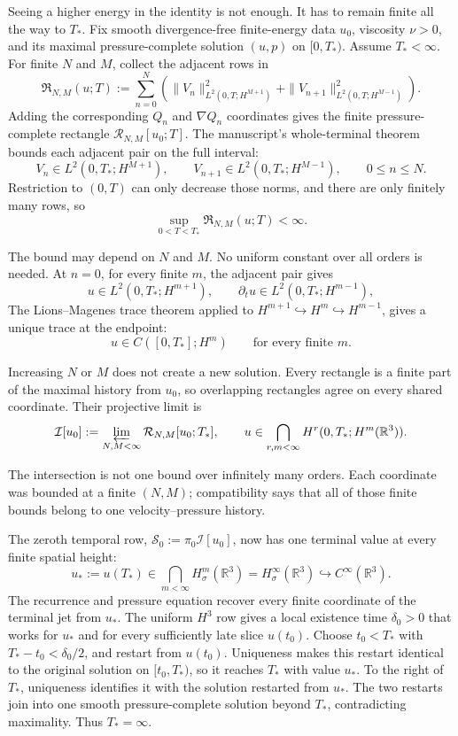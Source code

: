 Seeing a higher energy in the identity is not enough. It has to remain finite
all the way to \(T_*\). Fix smooth divergence-free finite-energy data \(u_0\),
viscosity \(\nu>0\), and its maximal pressure-complete solution \((u,p)\) on
\([0,T_*)\). Assume \(T_*<\infty\). For finite \(N\) and \(M\), collect the
adjacent rows in
\[
\mathfrak R_{N,M}(u;T)
:=\sum_{n=0}^{N}\left(
  \|V_n\|_{L^2(0,T;H^{M+1})}^2
 +\|V_{n+1}\|_{L^2(0,T;H^{M-1})}^2
\right).
\]
Adding the corresponding \(Q_n\) and \(\nabla Q_n\) coordinates gives the
finite pressure-complete rectangle \(\mathcal R_{N,M}[u_0;T]\). The
manuscript's whole-terminal theorem bounds each adjacent pair on the full
interval:
\[
V_n\in L^2(0,T_*;H^{M+1}),
\qquad
V_{n+1}\in L^2(0,T_*;H^{M-1}),
\qquad 0\le n\le N.
\]
Restriction to \((0,T)\) can only decrease those norms, and there are only
finitely many rows, so
\[
\sup_{0<T<T_*}\mathfrak R_{N,M}(u;T)<\infty.
\]
\begin{samepage}
The bound may depend on \(N\) and \(M\). No uniform constant over all orders is
needed. At \(n=0\), for every finite \(m\), the adjacent pair gives
\[
u\in L^2(0,T_*;H^{m+1}),
\qquad
\partial_tu\in L^2(0,T_*;H^{m-1}),
\]
The Lions--Magenes trace theorem applied to
\(H^{m+1}\hookrightarrow H^m\hookrightarrow H^{m-1}\), gives a unique
trace at the endpoint:
\[
u\in C([0,T_*];H^m)
\qquad\text{for every finite }m.
\]
\end{samepage}

\begin{samepage}
Increasing \(N\) or \(M\) does not create a new solution. Every rectangle is a
finite part of the maximal history from \(u_0\), so overlapping rectangles
agree on every shared coordinate. Their projective limit is
\[
\mathcal I[u_0]
:=\varprojlim_{N,M<\infty}\mathcal R_{N,M}[u_0;T_*],
\qquad
u\in\bigcap_{r,m<\infty}H^r(0,T_*;H^m(\mathbb R^3)).
\]
\end{samepage}
The intersection is not one bound over infinitely many orders. Each coordinate
was bounded at a finite \((N,M)\); compatibility says that all of those finite
bounds belong to one velocity--pressure history.

The zeroth temporal row, \(\mathscr S_0:=\pi_0\mathcal I[u_0]\), now has one
terminal value at every finite spatial height:
\[
u_*:=u(T_*)
\in\bigcap_{m<\infty}H^m_\sigma(\mathbb R^3)
=H^\infty_\sigma(\mathbb R^3)
\hookrightarrow C^\infty(\mathbb R^3).
\]
The recurrence and pressure equation recover every finite coordinate of the
terminal jet from \(u_*\). The uniform \(H^3\) row gives a local existence time
\(\delta_0>0\) that works for \(u_*\) and for every sufficiently late slice
\(u(t_0)\). Choose \(t_0<T_*\) with \(T_*-t_0<\delta_0/2\), and restart from
\(u(t_0)\). Uniqueness makes this restart identical to the original solution
on \([t_0,T_*)\), so it reaches \(T_*\) with value \(u_*\). To the right of
\(T_*\), uniqueness identifies it with the solution restarted from \(u_*\).
The two restarts join into one smooth pressure-complete solution beyond
\(T_*\), contradicting maximality. Thus \(T_*=\infty\).

